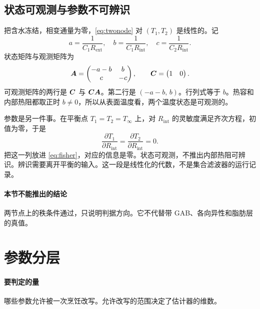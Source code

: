 \subsection{状态可观测与参数不可辨识}

把含水冻结，相变通量为零，\eqref{eq:twonode} 对 \((T_1,T_2)\) 是线性的。记
\[
a=\frac{1}{C_1 R_{\mathrm{ext}}},\quad
b=\frac{1}{C_1 R_{\mathrm{int}}},\quad
c=\frac{1}{C_2 R_{\mathrm{int}}}.
\]
状态矩阵与观测矩阵为
\begin{equation}
\label{eq:fv-obsv}
\bm{A}=\begin{pmatrix}-a-b & b\\ c & -c\end{pmatrix},\qquad
\bm{C}=\begin{pmatrix}1 & 0\end{pmatrix}.
\end{equation}
可观测矩阵的两行是 \(\bm{C}\) 与 \(\bm{C}\bm{A}\)。第二行是 \((-a-b,\, b)\)。行列式等于 \(b\)。热容和内部热阻都取正时 \(b\neq 0\)，所以从表面温度看，两个温度状态是可观测的。

参数是另一件事。在平衡点 \(T_1=T_2=T_\infty\) 上，对 \(R_{\mathrm{int}}\) 的灵敏度满足齐次方程，初值为零，于是
\begin{equation}
\label{eq:fv-fisher0}
\frac{\partial T_1}{\partial R_{\mathrm{int}}}=\frac{\partial T_2}{\partial R_{\mathrm{int}}}=0.
\end{equation}
把这一列放进 \eqref{eq:fisher}，对应的信息是零。状态可观测，不推出内部热阻可辨识。辨识需要离开平衡的输入。这一段是线性化的代数，不是集合滤波器的运行记录。

\paragraph{本节不能推出的结论}
两节点上的秩条件通过，只说明判据方向。它不代替带 GAB、各向异性和脂肪层的真值。

\section{参数分层}

\paragraph{要判定的量}
哪些参数允许被一次烹饪改写。允许改写的范围决定了估计器的维数。

